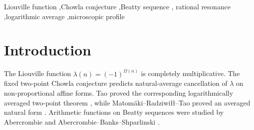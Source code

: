 \documentclass[preprint,12pt]{elsarticle}
\numberwithin{equation}{section}
\theoremstyle{plain}
\theoremstyle{definition}
\theoremstyle{definition}
\theoremstyle{remark}
\begin{document}
\begin{frontmatter}
\begin{abstract}
and its closed-form profile, extend the plateaus, the majority theorem and the
left-hand identity to every $k$, and show that the level-three family at the
resonances $(2,3)$ is, for every large $X$, the ordinary three-point sum
$\sum_{M\equiv3\,(6)}\lambda(M)\lambda(M+1)\lambda(M+3)$. For the bias method
behind the two-point theorem we prove that its centering step cannot be
extended to $k\ge3$ with the short-interval input it uses, that local $U^k$
uniformity suffices for that step, and that a quantitative local Gowers
uniformity hypothesis together with a $k$-linear divisor-graph hypothesis
yields $k$-point Chowla in progressions and the profile of the whole family.
\end{abstract}

\begin{keyword}
Liouville function \sep Chowla conjecture \sep Beatty sequence \sep
rational resonance \sep logarithmic average \sep microscopic profile
\end{keyword}

\end{frontmatter}

\tableofcontents

\section{Introduction}
\label{sec:introduction}

The Liouville function $\lambda(n)=(-1)^{\Omega(n)}$ is completely
multiplicative. The fixed two-point Chowla conjecture predicts natural-average
cancellation of $\lambda$ on non-proportional affine forms. Tao proved the
corresponding logarithmically averaged two-point theorem
\cite{Tao2016}, while Matom\"aki--Radziwi{\l}{\l}--Tao proved an averaged
natural form \cite{MRT2015}. Arithmetic functions on Beatty sequences were
studied by Abercrombie \cite{Abercrombie1995} and
Abercrombie--Banks--Shparlinski \cite{AbercrombieBanksShparlinski2009}.
\end{document}
